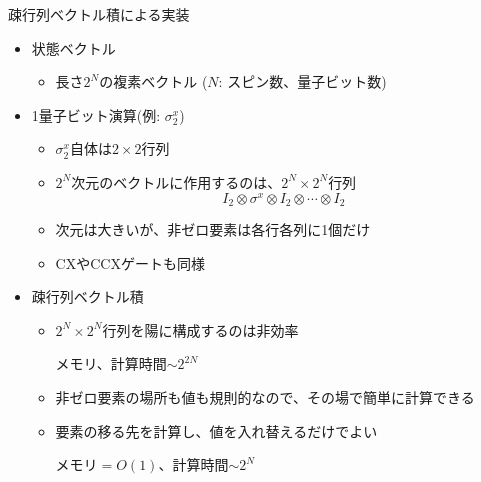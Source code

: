 \begin{frame}[t,fragile]{疎行列ベクトル積による実装}
  \begin{itemize}
    \item 状態ベクトル
      \begin{itemize}
        \item 長さ\(2^N\)の複素ベクトル (\(N\): スピン数、量子ビット数)
      \end{itemize}
    \item 1量子ビット演算(例: \(\sigma^x_2\))
      \begin{itemize}
        \item \(\sigma^x_2\)自体は\(2\times2\)行列
        \item \(2^N\)次元のベクトルに作用するのは、\(2^N\times2^N\)行列
          \[
            {I}_2 \otimes \sigma^x \otimes {I}_2 \otimes \cdots \otimes {I}_2
          \]
        \item 次元は大きいが、非ゼロ要素は各行各列に1個だけ
        \item CXやCCXゲートも同様
      \end{itemize}
    \item 疎行列ベクトル積
      \begin{itemize}
        \item \(2^N\times2^N\)行列を陽に構成するのは非効率
        
          メモリ、計算時間\(\sim 2^{2N}\)
        \item 非ゼロ要素の場所も値も規則的なので、その場で簡単に計算できる
        \item 要素の移る先を計算し、値を入れ替えるだけでよい
        
          メモリ\(=O(1)\)、計算時間\(\sim 2^{N}\)
      \end{itemize}
  
  \end{itemize}
\end{frame}
